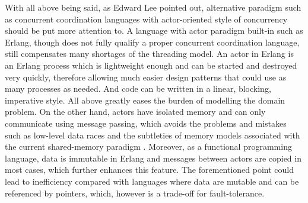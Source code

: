 With all above being said, as Edward Lee \cite{Lee:2006:PT:1137232.1137289} pointed out, alternative paradigm such as concurrent coordination languages with actor-oriented style of concurrency should be put more attention to. A language with actor paradigm built-in such as Erlang, though does not fully qualify a proper concurrent coordination language, still compensates many shortages of the threading model. An actor in Erlang is an Erlang process which is lightweight enough and can be started and destroyed very quickly, therefore allowing 
much easier design patterns that could use as many processes as needed. And code can be written in a linear, blocking, imperative style. All above greatly eases the burden of modelling the domain problem. On the other hand, actors have isolated memory and can only communicate using message passing, which avoids the problems and mistakes such as low-level data races and the subtleties of memory models associated with the current shared-memory paradigm \cite{UCAM-CL-TR-769}. Moreover, as a functional programming language, data is immutable in Erlang and messages between actors are copied in most cases, which further enhances this feature. The forementioned point could lead to inefficiency compared with languages where data are mutable and can be referenced by pointers, which, however is a trade-off for fault-tolerance.

